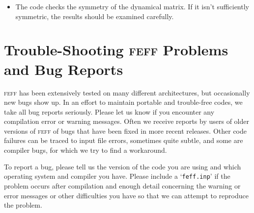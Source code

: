 \documentclass[11pt,oneside]{report} %
\newcommand{\program}[1]{\textsc{#1}}
\newcommand{\feff}{\program{feff}}
\newcommand{\file}[1]{`\texttt{#1}'}
\begin{document}
\begin{latexonly}
\begin{itemize}
\item The code checks the symmetry of the dynamical matrix. If it isn't sufficiently
  symmetric, the results should be examined carefully.
\end{itemize}



\chapter{Trouble-Shooting {\feff} Problems and Bug Reports}
\label{sec:Append-H-Trouble}

{\feff} has been extensively tested on many different architectures,
but occasionally new bugs show up. In an effort to maintain portable
and trouble-free codes, we take all bug reports seriously. Please
let us know if you encounter any compilation error or warning messages.
Often we receive reports by users of older
versions of {\feff} of bugs that have been fixed in more recent
releases. Other code failures can be traced to input file
errors, sometimes quite subtle, and some are compiler bugs, for which
we try to find a workaround.

To  report a bug, please tell us the version of the code you are using
and which operating system and compiler you have. Please include a
\file{feff.inp} if the problem occurs after compilation
and enough detail concerning the warning or error messages or
other difficulties you have so that we can attempt to reproduce the problem.


\end{latexonly}
\end{document}
